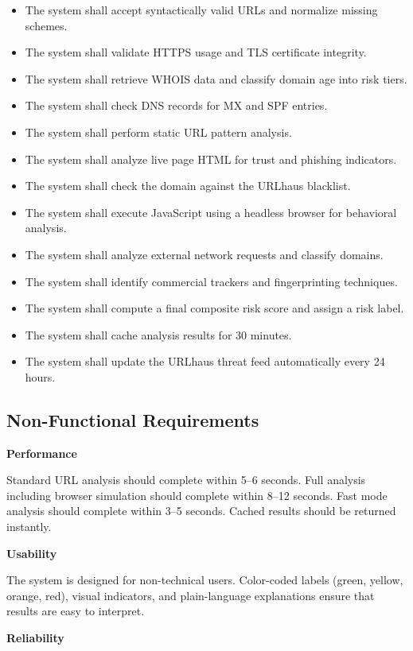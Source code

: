 \begin{itemize}
\item The system shall accept syntactically valid URLs and normalize missing schemes.
\item The system shall validate HTTPS usage and TLS certificate integrity.
\item The system shall retrieve WHOIS data and classify domain age into risk tiers.
\item The system shall check DNS records for MX and SPF entries.
\item The system shall perform static URL pattern analysis.
\item The system shall analyze live page HTML for trust and phishing indicators.
\item The system shall check the domain against the URLhaus blacklist.
\item The system shall execute JavaScript using a headless browser for behavioral analysis.
\item The system shall analyze external network requests and classify domains.
\item The system shall identify commercial trackers and fingerprinting techniques.
\item The system shall compute a final composite risk score and assign a risk label.
\item The system shall cache analysis results for 30 minutes.
\item The system shall update the URLhaus threat feed automatically every 24 hours.
\end{itemize}

\subsection{Non-Functional Requirements}

\textbf{Performance}

Standard URL analysis should complete within 5–6 seconds. Full analysis including browser simulation should complete within 8–12 seconds. Fast mode analysis should complete within 3–5 seconds. Cached results should be returned instantly.

\textbf{Usability}

The system is designed for non-technical users. Color-coded labels (green, yellow, orange, red), visual indicators, and plain-language explanations ensure that results are easy to interpret.

\textbf{Reliability}

